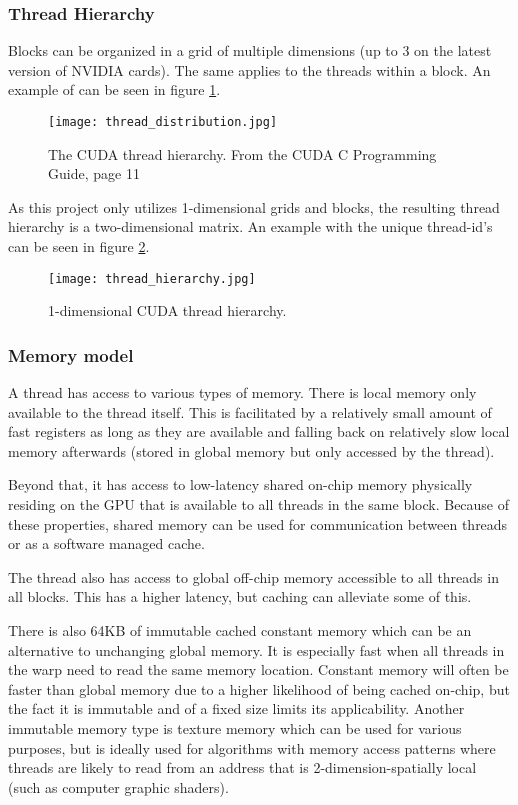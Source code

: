 \subsubsection{Thread Hierarchy}
Blocks can be organized in a grid of multiple dimensions (up to 3 on the latest version of NVIDIA cards). 
The same applies to the threads within a block.
An example of can be seen in figure \ref{thread_distribution}.

\begin{figure}[h!]\centering
\texttt{[image: thread\_distribution.jpg]}
\caption{The CUDA thread hierarchy. From the CUDA C Programming Guide, page 11 \cite{nvidia2014programming}\label{thread_distribution}}
\end{figure}

As this project only utilizes 1-dimensional grids and blocks, the resulting thread hierarchy is a two-dimensional matrix. 
An example with the unique thread-id's can be seen in figure \ref{thread_hierarchy}.

\begin{figure}[h!]\centering
\texttt{[image: thread\_hierarchy.jpg]}
\caption{1-dimensional CUDA thread hierarchy.\label{thread_hierarchy}}
\end{figure}


\subsubsection{Memory model}
A thread has access to various types of memory.
There is local memory only available to the thread itself.
This is facilitated by a relatively small amount of fast registers as long as they are available and falling back on relatively slow local memory afterwards (stored in global memory but only accessed by the thread).

Beyond that, it has access to low-latency shared on-chip memory physically residing on the GPU that is available to all threads in the same block. 
Because of these properties, shared memory can be used for communication between threads or as a software managed cache.

The thread also has access to global off-chip memory accessible to all threads in all blocks.
This has a higher latency, but caching can alleviate some of this.

There is also 64KB of immutable cached constant memory which can be an alternative to unchanging global memory.
It is especially fast when all threads in the warp need to read the same memory location.
Constant memory will often be faster than global memory due to a higher likelihood of being cached on-chip, but the fact it is immutable and of a fixed size limits its applicability.
Another immutable memory type is texture memory which can be used for various purposes, but is ideally used for algorithms with memory access patterns where threads are likely to read from an address that is 2-dimension-spatially local (such as computer graphic shaders).

